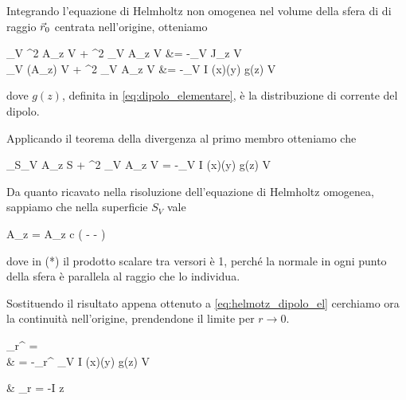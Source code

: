 Integrando l'equazione di Helmholtz non omogenea nel volume della sfera di di raggio $\vec{r}_0$ centrata nell'origine, otteniamo
\begin{esp*}
	\int_V \nabla^2 A_z \de V + \omega^2 \mu \epsilon \int_V A_z \de V &= -\mu \int_V J_z \de V \\
	\int_V \diverg(\nabla A_z) \de V + \omega^2 \mu \epsilon \int_V A_z \de V &= -\mu \int_V I \delta(x)\delta(y) g(z) \de V
\end{esp*}
dove $g(z)$, definita in \autoref{eq:dipolo_elementare}, è la distribuzione di corrente del dipolo.

Applicando il teorema della divergenza al primo membro otteniamo che
\begin{esp} \label{eq:helmotz_dipolo_el}
	\int_{S_V} \nabla A_z  \de S
	+ \omega^2 \mu \epsilon \int_V A_z \de V
	= -\mu \int_V I \delta(x)\delta(y) g(z) \de V \\
\end{esp}

Da quanto ricavato nella risoluzione dell'equazione di Helmholtz omogenea, sappiamo che nella superficie $S_V$ vale
\begin{esp*}
	\nabla A_z \cdot {}
	=  A_z  \cdot {}
	\stackrel{(*)}{=} c \left(
			-\jmath \beta {}
			- 
		\right)
\end{esp*}
dove in (*) il prodotto scalare tra versori è 1, perché la normale in ogni punto della sfera è parallela al raggio che lo individua.

Sostituendo il risultato appena ottenuto a \autoref{eq:helmotz_dipolo_el} cerchiamo ora la continuità nell'origine, prendendone il limite per $r \to 0$.

\begin{esp*}
	\lim_{r^\prime {}}  = \\
	& = -\mu \lim_{r^\prime {}} \int_V I \delta(x)\delta(y) g(z) \de V \\
\end{esp*}

\begin{esp*}
	& \lim_{r } 
	= -\mu I \Delta z \\
\end{esp*}

